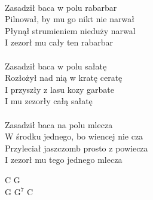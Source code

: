 \documentclass[a5paper, 10pt]{book}
\begin{document}
\begin{minipage}[t]{0.8\textwidth}
  \\
  Zasadził baca w polu rabarbar\\
  Pilnował, by mu go nikt nie narwał\\
  Płynął strumieniem nieduży narwal\\
  I zezorł mu cały ten rabarbar\\
  \\
  Zasadził baca w polu sałatę\\
  Rozłożył nad nią w kratę ceratę\\
  I przyszły z lasu kozy garbate\\
  I mu zezorły całą sałatę\\
  \\
  Zasadził baca na polu mlecza\\
  W środku jednego, bo wiencej nie cza\\
  Przyleciał jaszczomb prosto z powiecza\\
  I zezorł mu tego jednego mlecza\\

\end{minipage}
\begin{minipage}[t]{0.2\textwidth}
  C G\\
  G G$^7$ C\\
\end{minipage}

\newpage
\end{document}
